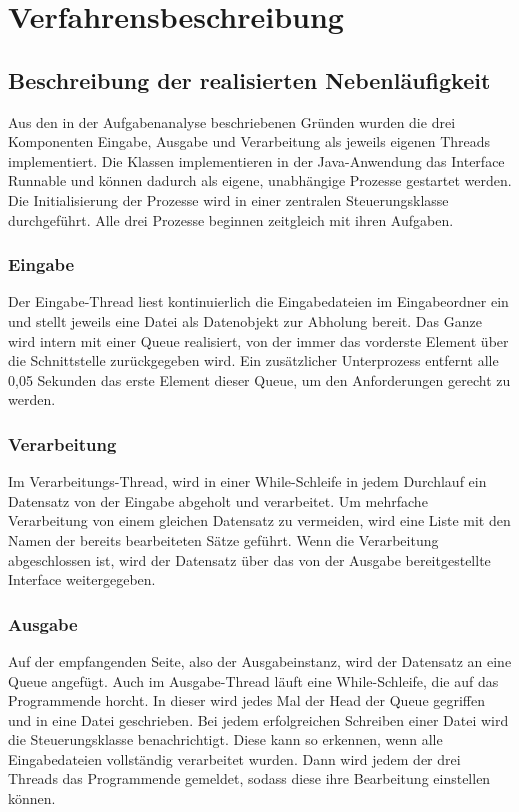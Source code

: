 \chapter{Verfahrensbeschreibung}\label{ch:verfahrensbeschreibung}

\section{Beschreibung der realisierten Nebenläufigkeit}\label{sec:nebenl}
Aus den in der Aufgabenanalyse beschriebenen Gründen wurden die drei Komponenten Eingabe, Ausgabe und Verarbeitung als jeweils eigenen Threads implementiert.
Die Klassen implementieren in der Java-Anwendung das Interface Runnable und können dadurch als eigene, unabhängige Prozesse gestartet werden.
Die Initialisierung der Prozesse wird in einer zentralen Steuerungsklasse durchgeführt.
Alle drei Prozesse beginnen zeitgleich mit ihren Aufgaben.


\subsection{Eingabe}\label{subsec:eingabe}
Der Eingabe-Thread liest kontinuierlich die Eingabedateien im Eingabeordner ein und stellt jeweils eine Datei als Datenobjekt zur Abholung bereit.
Das Ganze wird intern mit einer Queue realisiert, von der immer das vorderste Element über die Schnittstelle zurückgegeben wird.
Ein zusätzlicher Unterprozess entfernt alle 0,05 Sekunden das erste Element dieser Queue, um den Anforderungen gerecht zu werden.

\subsection{Verarbeitung}\label{subsec:verarbeitung}
Im Verarbeitungs-Thread, wird in einer While-Schleife in jedem Durchlauf ein Datensatz von der Eingabe abgeholt und verarbeitet.
Um mehrfache Verarbeitung von einem gleichen Datensatz zu vermeiden, wird eine Liste mit den Namen der bereits bearbeiteten Sätze geführt.
Wenn die Verarbeitung abgeschlossen ist, wird der Datensatz über das von der Ausgabe bereitgestellte Interface weitergegeben.

\subsection{Ausgabe}\label{subsec:ausgabe}
Auf der empfangenden Seite, also der Ausgabeinstanz, wird der Datensatz an eine Queue angefügt.
Auch im Ausgabe-Thread läuft eine While-Schleife, die auf das Programmende horcht.
In dieser wird jedes Mal der Head der Queue gegriffen und in eine Datei geschrieben.
Bei jedem erfolgreichen Schreiben einer Datei wird die Steuerungsklasse benachrichtigt.
Diese kann so erkennen, wenn alle Eingabedateien vollständig verarbeitet wurden.
Dann wird jedem der drei Threads das Programmende gemeldet, sodass diese ihre Bearbeitung einstellen können.

